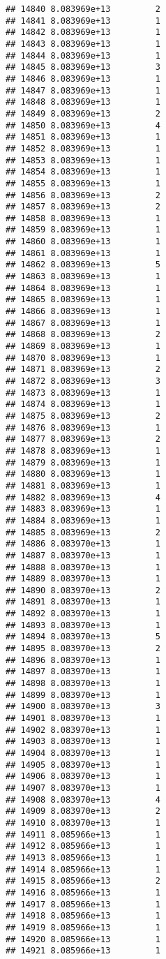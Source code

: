 \documentclass[
]{article}
\begin{document}
\begin{verbatim}
## 14840 8.083969e+13         2
## 14841 8.083969e+13         1
## 14842 8.083969e+13         1
## 14843 8.083969e+13         1
## 14844 8.083969e+13         1
## 14845 8.083969e+13         3
## 14846 8.083969e+13         1
## 14847 8.083969e+13         1
## 14848 8.083969e+13         1
## 14849 8.083969e+13         2
## 14850 8.083969e+13         4
## 14851 8.083969e+13         1
## 14852 8.083969e+13         1
## 14853 8.083969e+13         1
## 14854 8.083969e+13         1
## 14855 8.083969e+13         1
## 14856 8.083969e+13         2
## 14857 8.083969e+13         2
## 14858 8.083969e+13         1
## 14859 8.083969e+13         1
## 14860 8.083969e+13         1
## 14861 8.083969e+13         1
## 14862 8.083969e+13         5
## 14863 8.083969e+13         1
## 14864 8.083969e+13         1
## 14865 8.083969e+13         1
## 14866 8.083969e+13         1
## 14867 8.083969e+13         1
## 14868 8.083969e+13         2
## 14869 8.083969e+13         1
## 14870 8.083969e+13         1
## 14871 8.083969e+13         2
## 14872 8.083969e+13         3
## 14873 8.083969e+13         1
## 14874 8.083969e+13         1
## 14875 8.083969e+13         2
## 14876 8.083969e+13         1
## 14877 8.083969e+13         2
## 14878 8.083969e+13         1
## 14879 8.083969e+13         1
## 14880 8.083969e+13         1
## 14881 8.083969e+13         1
## 14882 8.083969e+13         4
## 14883 8.083969e+13         1
## 14884 8.083969e+13         1
## 14885 8.083969e+13         2
## 14886 8.083970e+13         1
## 14887 8.083970e+13         1
## 14888 8.083970e+13         1
## 14889 8.083970e+13         1
## 14890 8.083970e+13         2
## 14891 8.083970e+13         1
## 14892 8.083970e+13         1
## 14893 8.083970e+13         1
## 14894 8.083970e+13         5
## 14895 8.083970e+13         2
## 14896 8.083970e+13         1
## 14897 8.083970e+13         1
## 14898 8.083970e+13         1
## 14899 8.083970e+13         1
## 14900 8.083970e+13         3
## 14901 8.083970e+13         1
## 14902 8.083970e+13         1
## 14903 8.083970e+13         1
## 14904 8.083970e+13         1
## 14905 8.083970e+13         1
## 14906 8.083970e+13         1
## 14907 8.083970e+13         1
## 14908 8.083970e+13         4
## 14909 8.083970e+13         2
## 14910 8.083970e+13         1
## 14911 8.085966e+13         1
## 14912 8.085966e+13         1
## 14913 8.085966e+13         1
## 14914 8.085966e+13         1
## 14915 8.085966e+13         2
## 14916 8.085966e+13         1
## 14917 8.085966e+13         1
## 14918 8.085966e+13         1
## 14919 8.085966e+13         1
## 14920 8.085966e+13         1
## 14921 8.085966e+13         1

\end{verbatim}
\end{document}
